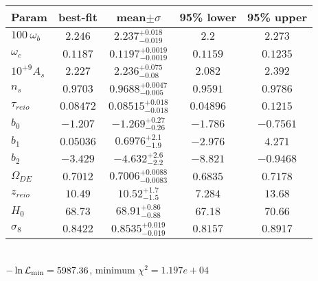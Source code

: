 \begin{tabular}{|l|c|c|c|c|} 
 \hline 
Param & best-fit & mean$\pm\sigma$ & 95\% lower & 95\% upper \\ \hline 
$100~\omega_{b }$ &$2.246$ & $2.237_{-0.019}^{+0.018}$ & $2.2$ & $2.273$ \\ 
$\omega_c$ &$0.1187$ & $0.1197_{-0.0019}^{+0.0019}$ & $0.1159$ & $0.1235$ \\ 
$10^{+9}A_{s }$ &$2.227$ & $2.236_{-0.08}^{+0.075}$ & $2.082$ & $2.392$ \\ 
$n_{s }$ &$0.9703$ & $0.9688_{-0.005}^{+0.0047}$ & $0.9591$ & $0.9786$ \\ 
$\tau_{reio }$ &$0.08472$ & $0.08515_{-0.018}^{+0.018}$ & $0.04896$ & $0.1215$ \\ 
$b_{0 }$ &$-1.207$ & $-1.269_{-0.26}^{+0.27}$ & $-1.786$ & $-0.7561$ \\ 
$b_{1 }$ &$0.05036$ & $0.6976_{-1.9}^{+2.1}$ & $-2.976$ & $4.271$ \\ 
$b_{2 }$ &$-3.429$ & $-4.632_{-2.2}^{+2.6}$ & $-8.821$ & $-0.9468$ \\ 
$\Omega_{DE}$ &$0.7012$ & $0.7006_{-0.0083}^{+0.0088}$ & $0.6835$ & $0.7178$ \\ 
$z_{reio }$ &$10.49$ & $10.52_{-1.5}^{+1.7}$ & $7.284$ & $13.68$ \\ 
$H_{0 }$ &$68.73$ & $68.91_{-0.88}^{+0.86}$ & $67.18$ & $70.66$ \\ 
$\sigma_8$ &$0.8422$ & $0.8535_{-0.019}^{+0.019}$ & $0.8157$ & $0.8917$ \\ 
\hline 
 \end{tabular} \\ 
$-\ln{\cal L}_\mathrm{min} =5987.36$, minimum $\chi^2=1.197e+04$ \\ 
